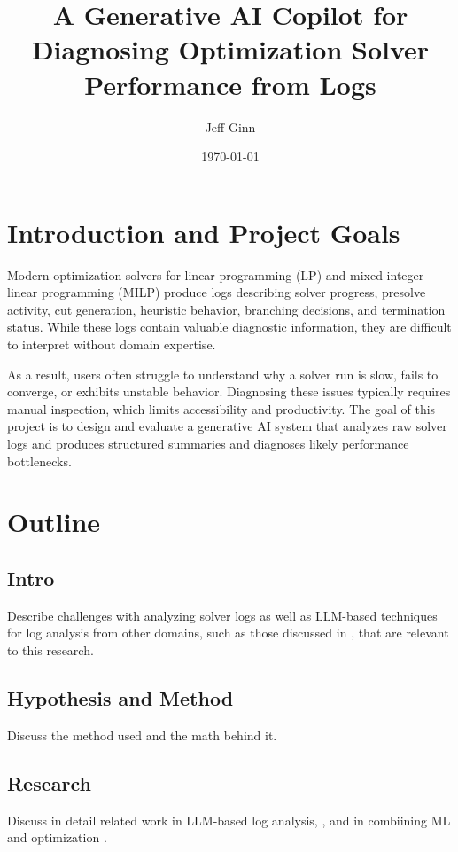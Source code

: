 \documentclass[11pt]{article}
\title{A Generative AI Copilot for Diagnosing Optimization Solver Performance from Logs}
\author{Jeff Ginn}
\date{\today}
\begin{document}
\maketitle

\section{Introduction and Project Goals}

Modern optimization solvers for linear programming (LP) and mixed-integer linear programming (MILP) produce logs describing solver progress, presolve activity, cut generation, heuristic behavior, branching decisions, and termination status. While these logs contain valuable diagnostic information, they are difficult to interpret without domain expertise.

As a result, users often struggle to understand why a solver run is slow, fails to converge, or exhibits unstable behavior. Diagnosing these issues typically requires manual inspection, which limits accessibility and productivity.
The goal of this project is to design and evaluate a generative AI system that analyzes raw solver logs and produces structured summaries and diagnoses likely performance bottlenecks.

\section{Outline}

\subsection*{Intro}
Describe challenges with analyzing solver logs as well as LLM-based techniques for log analysis
from other domains, such as those discussed in \cite{akhtar2025llmbasedeventloganalysis} \cite{landauer2023deeplearningloganomaly}, that are relevant to this research.

\subsection*{Hypothesis and Method}
Discuss the method used and the math behind it.

\subsection*{Research}
Discuss in detail related work in LLM-based log analysis, \cite{akhtar2025llmbasedeventloganalysis} \cite{landauer2023deeplearningloganomaly}, and in combiining ML and optimization \cite{bengio2018mlforcombinatorial} \cite{kotary2021endtoend} \cite{yazdani2025evocut}.
\end{document}

